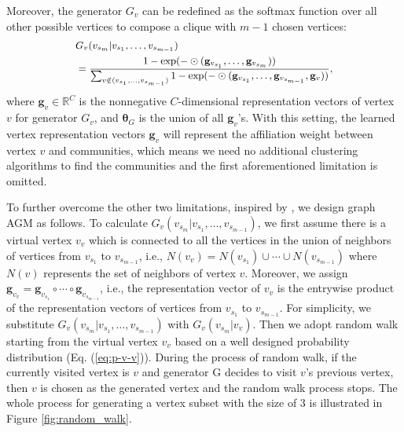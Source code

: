 \documentclass[sigconf]{acmart}
\begin{document}
Moreover, the generator $G_v$ can be redefined as the softmax function over all other possible vertices to compose a clique with $m-1$ chosen vertices:
\begin{equation}
  \small
  \label{eq:gv-agm}
  \begin{aligned}
    &G_v(v_{s_m}|v_{s_1},\ldots ,v_{s_{m-1}})  \\
    &= \frac{1 - \exp(-\odot(\mathbf{g}_{v_{s_1}},\ldots ,\mathbf{g}_{v_{s_m}}))}{\sum_{v \notin (v_{s_1},\ldots ,v_{s_{m-1}})}{1 - \exp(-\odot(\mathbf{g}_{v_{s_1}},\ldots ,\mathbf{g}_{v_{s_{m-1}}},\mathbf{g}_{v}))}},
  \end{aligned}
\end{equation}
where $\mathbf{g}_v \in \mathbb{R}^C$ is the nonnegative $C$-dimensional representation vectors of vertex $v$ for generator $G_v$, and $\mathbf{\theta}_G$ is the union of all $\mathbf{g}_v$'s.
With this setting, the learned vertex representation vectors $\mathbf{g}_v$ will represent the affiliation weight between vertex $v$ and communities, which means we need no additional clustering algorithms to find the communities and the first aforementioned limitation is omitted.

To further overcome the other two limitations, inspired by \cite{GraphGAN}, we design graph AGM as follows.
To calculate $G_v(v_{s_m}|v_{s_1},\ldots,v_{s_{m-1}})$, we first assume there is a virtual vertex $v_v$ which is connected to all the vertices in the union of neighbors of vertices from $v_{s_1}$ to $v_{s_{m-1}}$, i.e., $N(v_v)=N(v_{s_1})\cup\cdots \cup N(v_{s_{m-1}})$ where $N(v)$ represents the set of neighbors of vertex $v$.
Moreover, we assign $\mathbf{g}_{v_v} = \mathbf{g}_{v_{s_1}} \circ\cdots\circ \mathbf{g}_{v_{s_{m-1}}}$, i.e., the representation vector of $v_v$ is the entrywise product of the representation vectors of vertices from $v_{s_1}$ to $v_{s_{m-1}}$.
For simplicity, we substitute $G_v(v_{s_m}|v_{s_1},\ldots ,v_{s_{m-1}})$ with $G_v(v_{s_m}|v_v)$.
Then we adopt random walk starting from the virtual vertex $v_v$ based on a well designed probability distribution (Eq. (\ref{eq:p-v-v})).
During the process of random walk, if the currently visited vertex is $v$ and generator G decides to visit $v$'s previous vertex, then $v$ is chosen as the generated vertex and the random walk process stops.
The whole process for generating a vertex subset with the size of 3 is illustrated in Figure \ref{fig:random_walk}.
\end{document}
